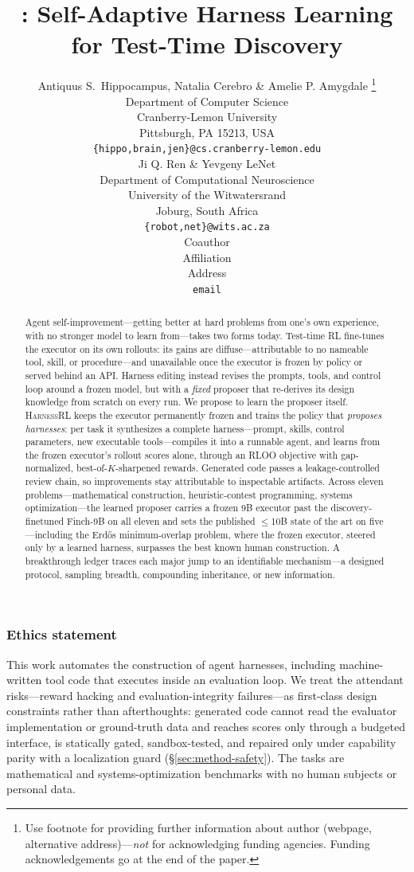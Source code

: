 \documentclass{article} %
\title{\method: Self-Adaptive Harness Learning for Test-Time Discovery}
\author{Antiquus S.~Hippocampus, Natalia Cerebro \& Amelie P. Amygdale \thanks{ Use footnote for providing further information
about author (webpage, alternative address)---\emph{not} for acknowledging
funding agencies.  Funding acknowledgements go at the end of the paper.} \\
Department of Computer Science\\
Cranberry-Lemon University\\
Pittsburgh, PA 15213, USA \\
\texttt{\{hippo,brain,jen\}@cs.cranberry-lemon.edu} \\
\And
Ji Q. Ren \& Yevgeny LeNet \\
Department of Computational Neuroscience \\
University of the Witwatersrand \\
Joburg, South Africa \\
\texttt{\{robot,net\}@wits.ac.za} \\
\AND
Coauthor \\
Affiliation \\
Address \\
\texttt{email}
}
\newcommand{\method}{\textsc{HarnessRL}\xspace}
\begin{document}
\maketitle

\begin{abstract}
Agent self-improvement---getting better at hard problems from one's own
experience, with no stronger model to learn from---takes two forms today.  Test-time RL fine-tunes the executor on its own rollouts: its gains are
diffuse---attributable to no nameable tool, skill, or procedure---and
unavailable once the executor is frozen by policy or served behind an API.  Harness editing instead revises the prompts, tools,
and control loop around a frozen model, but with a \emph{fixed} proposer that
re-derives its design knowledge from scratch on every run.  We propose to
learn the proposer itself.  \method{} keeps the executor permanently frozen
and trains the policy that \emph{proposes harnesses}: per task it synthesizes a
complete harness---prompt, skills, control parameters, new executable
tools---compiles it into a runnable agent, and learns from the frozen
executor's rollout scores alone, through an RLOO objective with
gap-normalized, best-of-$K$-sharpened rewards.  Generated code passes a leakage-controlled review chain, so improvements
stay attributable to inspectable artifacts.  Across eleven problems---mathematical construction, heuristic-contest
programming, systems optimization---the learned proposer carries a frozen 9B executor past
the discovery-finetuned Finch-9B on all eleven and sets the published
$\le$10B state of the art on five---including the Erd\H{o}s minimum-overlap
problem, where the frozen executor, steered only by a learned harness,
surpasses the best known human construction.  A breakthrough ledger traces each major jump to an identifiable
mechanism---a designed protocol, sampling breadth, compounding inheritance,
or new information.
\end{abstract}








\subsubsection*{Ethics statement}
This work automates the construction of agent harnesses, including
machine-written tool code that executes inside an evaluation loop.  We treat
the attendant risks---reward hacking and evaluation-integrity failures---as
first-class design constraints rather than afterthoughts: generated code cannot read the
evaluator implementation or ground-truth data and reaches scores only through a
budgeted interface, is statically gated,
sandbox-tested, and repaired only under capability parity with a localization
guard (\S\ref{sec:method-safety}).  The tasks are mathematical and
systems-optimization benchmarks with no human subjects or personal data.
\end{document}
